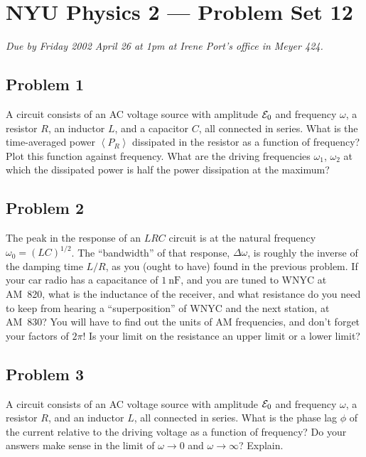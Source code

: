 \documentclass{article}
\begin{document}
\thispagestyle{empty}
\section*{NYU Physics 2 --- Problem Set 12}

\emph{Due by Friday 2002 April 26 at 1pm at Irene Port's office in
Meyer 424.}

\subsection*{Problem 1}

A circuit consists of an AC voltage source with amplitude ${\cal E}_0$
and frequency $\omega$, a resistor $R$, an inductor $L$, and a
capacitor $C$, all connected in series.  What is the time-averaged
power $\left<P_R\right>$ dissipated in the resistor as a function of
frequency?  Plot this function against frequency.  What are the
driving frequencies $\omega_1$, $\omega_2$ at which the dissipated
power is half the power dissipation at the maximum?

\subsection*{Problem 2}

The peak in the response of an $LRC$ circuit is at the natural
frequency $\omega_0=(LC)^{1/2}$.  The ``bandwidth'' of that response,
$\Delta\omega$, is roughly the inverse of the damping time $L/R$, as
you (ought to have) found in the previous problem.  If your car radio
has a capacitance of $1~\mathrm{nF}$, and you are tuned to WNYC at
AM~820, what is the inductance of the receiver, and what resistance do
you need to keep from hearing a ``superposition'' of WNYC and the next
station, at AM~830?  You will have to find out the units of AM
frequencies, and don't forget your factors of $2\pi$!  Is your limit
on the resistance an upper limit or a lower limit?

\subsection*{Problem 3}

A circuit consists of an AC voltage source with amplitude ${\cal E}_0$
and frequency $\omega$, a resistor $R$, and an inductor $L$, all
connected in series.  What is the phase lag $\phi$ of the current
relative to the driving voltage as a function of frequency?  Do your
answers make sense in the limit of $\omega\rightarrow 0$ and
$\omega\rightarrow\infty$?  Explain.
\end{document}
